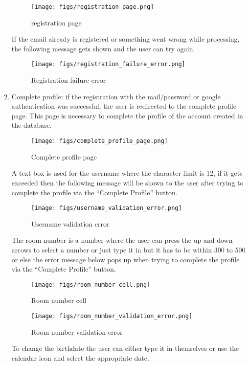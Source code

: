 \documentclass[conference]{IEEEtran}
\begin{document}
\begin{enumerate}
\begin{figure}[H]
    \centering
    \texttt{[image: figs/registration\_page.png]}
    \caption{registration page}
    \label{fig:Registration page}
    \end{figure}
    If the email already is registered or something went wrong while processing, the following message gets shown and the user can try again.
    \begin{figure}[H]
    \centering
    \texttt{[image: figs/registration\_failure\_error.png]}
    \caption{Registration failure error}
    \label{fig:Registration failure error}
    \end{figure}
    \item Complete profile: if the registration with the mail/password or google authentication was successful, the user is redirected to the complete profile page. This page is necessary to complete the profile of the account created in the database.
    \begin{figure}[H]
    \centering
    \texttt{[image: figs/complete\_profile\_page.png]}
    \caption{Complete profile page}
    \label{fig:Complete profile page}
    \end{figure}
    A text box is used for the username where the character limit is 12, if it gets exceeded then the following message will be shown to the user after trying to complete the profile via the “Complete Profile” button.
    \begin{figure}[H]
    \centering
    \texttt{[image: figs/username\_validation\_error.png]}
    \caption{Username validation error}
    \label{fig:Complete profile page}
    \end{figure}
    The room number is a number where the user can press the up and down arrows to select a number or just type it in but it has to be within 300 to 500 or else the error message below pops up when trying to complete the profile via the “Complete Profile” button.
    \begin{figure}[H]
    \centering
    \texttt{[image: figs/room\_number\_cell.png]}
    \caption{Room number cell}
    \label{fig:Room number cell}
    \end{figure}
    \begin{figure}[H]
    \centering
    \texttt{[image: figs/room\_number\_validation\_error.png]}
    \caption{Room number validation error}
    \label{fig:Room number validation error}
    \end{figure}
    To change the birthdate the user can either type it in themselves or use the calendar icon and select the appropriate date.

\end{enumerate}
\end{document}
